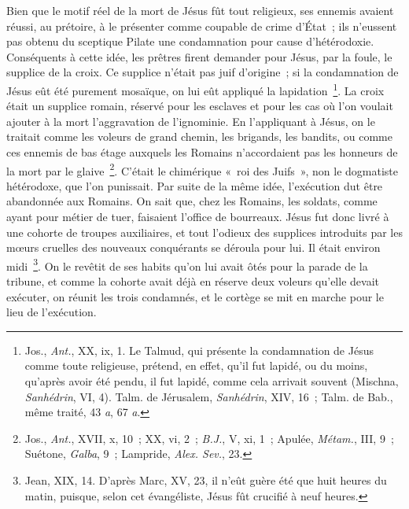 \documentclass[french,twoside]{book} %
\newcommand\chaptercont{} %
\begin{document}
\chaptercont
\noindent Bien que le motif réel de la mort de Jésus fût tout religieux, ses ennemis avaient réussi, au prétoire, à le présenter comme coupable de crime d’État ; ils n’eussent pas obtenu du sceptique Pilate une condamnation pour cause d’hétérodoxie. Conséquents à cette idée, les prêtres firent demander pour Jésus, par la foule, le supplice de la croix. Ce supplice n’était pas juif d’origine ; si la condamnation de Jésus eût été purement mosaïque, on lui eût appliqué la lapidation \footnote{ Jos., {\itshape Ant.}, XX, ix, 1. Le Talmud, qui présente la condamnation de Jésus comme toute religieuse, prétend, en effet, qu’il fut lapidé, ou du moins, qu’après avoir été pendu, il fut lapidé, comme cela arrivait souvent (Mischna, {\itshape Sanhédrin}, VI, 4). Talm. de Jérusalem, {\itshape Sanhédrin}, XIV, 16 ; Talm. de Bab., même traité, 43 {\itshape a}, 67 {\itshape a}.}. La croix était un supplice romain, réservé pour les esclaves et pour les cas où l’on voulait ajouter à la mort l’aggravation de l’ignominie. En l’appliquant à Jésus, on le traitait comme les voleurs de grand chemin, les brigands, les bandits, ou comme ces ennemis de bas étage auxquels les Romains n’accordaient pas les honneurs de la mort par le glaive \footnote{ Jos., {\itshape Ant.}, XVII, x, 10 ; XX, vi, 2 ; {\itshape B.J.}, V, xi, 1 ; Apulée, {\itshape Métam.}, III, 9 ; Suétone, {\itshape Galba}, 9 ; Lampride, {\itshape Alex. Sev.}, 23.}. C’était le chimérique « roi des Juifs », non le dogmatiste hétérodoxe, que l’on punissait. Par suite de la même idée, l’exécution dut être abandonnée aux Romains. On sait que, chez les Romains, les soldats, comme ayant pour métier de tuer, faisaient l’office de bourreaux. Jésus fut donc livré à une cohorte de troupes auxiliaires, et tout l’odieux des supplices introduits par les mœurs cruelles des nouveaux conquérants se déroula pour lui. Il était environ midi \footnote{Jean, XIX, 14. D’après Marc, XV, 23, il n’eût guère été que huit heures du matin, puisque, selon cet évangéliste, Jésus fût crucifié à neuf heures.}. On le revêtit de ses habits qu’on lui avait ôtés pour la parade de la tribune, et comme la cohorte avait déjà en réserve deux voleurs qu’elle devait exécuter, on réunit les trois condamnés, et le cortège se mit en marche pour le lieu de l’exécution.\par
\end{document}
